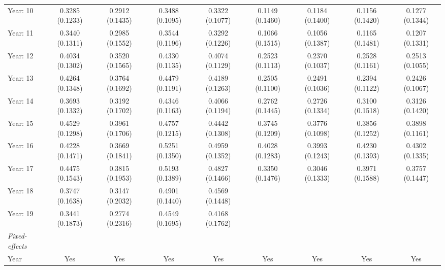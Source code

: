 \begin{tabular}{lcccccccc}
   Year: 10                            & 0.3285 (0.1233)  & 0.2912 (0.1435)  & 0.3488 (0.1095)  & 0.3322 (0.1077)  & 0.1149 (0.1460)  & 0.1184 (0.1400)  & 0.1156 (0.1420)  & 0.1277 (0.1344)\\   
   Year: 11                            & 0.3440 (0.1311)  & 0.2985 (0.1552)  & 0.3544 (0.1196)  & 0.3292 (0.1226)  & 0.1066 (0.1515)  & 0.1056 (0.1387)  & 0.1165 (0.1481)  & 0.1207 (0.1331)\\   
   Year: 12                            & 0.4034 (0.1302)  & 0.3520 (0.1565)  & 0.4330 (0.1135)  & 0.4074 (0.1129)  & 0.2523 (0.1113)  & 0.2370 (0.1037)  & 0.2528 (0.1161)  & 0.2513 (0.1055)\\   
   Year: 13                            & 0.4264 (0.1348)  & 0.3764 (0.1692)  & 0.4479 (0.1191)  & 0.4189 (0.1263)  & 0.2505 (0.1100)  & 0.2491 (0.1036)  & 0.2394 (0.1122)  & 0.2426 (0.1067)\\   
   Year: 14                            & 0.3693 (0.1332)  & 0.3192 (0.1702)  & 0.4346 (0.1163)  & 0.4066 (0.1194)  & 0.2762 (0.1445)  & 0.2726 (0.1334)  & 0.3100 (0.1518)  & 0.3126 (0.1420)\\   
   Year: 15                            & 0.4529 (0.1298)  & 0.3961 (0.1706)  & 0.4757 (0.1215)  & 0.4442 (0.1308)  & 0.3745 (0.1209)  & 0.3776 (0.1098)  & 0.3856 (0.1252)  & 0.3898 (0.1161)\\   
   Year: 16                            & 0.4228 (0.1471)  & 0.3669 (0.1841)  & 0.5251 (0.1350)  & 0.4959 (0.1352)  & 0.4028 (0.1283)  & 0.3993 (0.1243)  & 0.4230 (0.1393)  & 0.4302 (0.1335)\\   
   Year: 17                            & 0.4475 (0.1543)  & 0.3815 (0.1953)  & 0.5193 (0.1389)  & 0.4827 (0.1466)  & 0.3350 (0.1476)  & 0.3046 (0.1333)  & 0.3971 (0.1588)  & 0.3757 (0.1447)\\   
   Year: 18                            & 0.3747 (0.1638)  & 0.3147 (0.2032)  & 0.4901 (0.1440)  & 0.4569 (0.1448)  &                  &                  &                  &   \\   
   Year: 19                            & 0.3441 (0.1873)  & 0.2774 (0.2316)  & 0.4549 (0.1695)  & 0.4168 (0.1762)  &                  &                  &                  &   \\   
   \midrule
   \emph{Fixed-effects}\\
   Year                                & Yes              & Yes              & Yes              & Yes              & Yes              & Yes              & Yes              & Yes\\  

\end{tabular}
